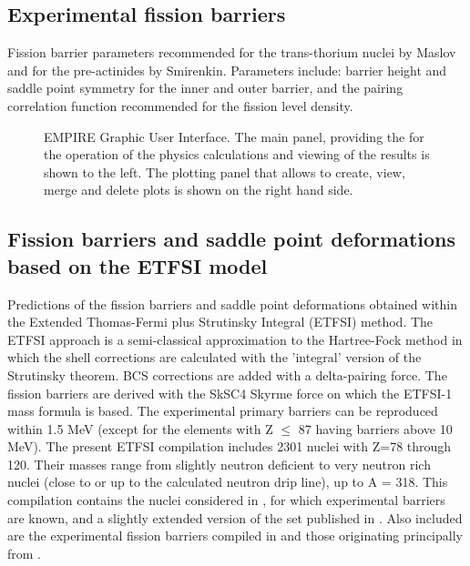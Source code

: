\subsection{Experimental fission barriers}

Fission barrier parameters recommended for the trans-thorium nuclei by
Maslov and for the pre-actinides by Smirenkin. Parameters include: barrier
height and saddle point symmetry for the inner and outer barrier, and the
pairing correlation function recommended for the fission level density.

\begin{figure*}[htbp]
 
\caption{EMPIRE Graphic User Interface. The main panel, providing the for
the operation of the physics calculations and viewing of the results is
shown to the left. The plotting panel that allows to create, view, merge
and delete plots is shown on the right hand side.}
\label{fig:GUI}
\end{figure*}

\subsection{Fission barriers and saddle point deformations based on the
ETFSI model}

Predictions of the fission barriers and saddle point deformations obtained
within the Extended Thomas-Fermi plus Strutinsky Integral (ETFSI) method.
The ETFSI approach is a semi-classical approximation to the Hartree-Fock
method in which the shell corrections are calculated with the 'integral'
version of the Strutinsky theorem. BCS corrections are added with a
delta-pairing force. The fission barriers are derived with the SkSC4 Skyrme
force on which the ETFSI-1 mass formula is based. The experimental primary
barriers can be reproduced within 1.5 MeV (except for the elements with Z $%
\le$ 87 having barriers above 10 MeV). The present ETFSI compilation
includes 2301 nuclei with Z=78 through 120. Their masses range from slightly
neutron deficient to very neutron rich nuclei (close to or up to the
calculated neutron drip line), up to A = 318. This compilation contains the
nuclei considered in \cite{Mamdouh1998}, for which experimental barriers are
known, and a slightly extended version of the set published in \cite%
{Mamdouh(2001)}. Also included are the experimental fission barriers
compiled in \cite{Mamdouh1998} and those originating principally from \cite%
{Smirenkin1993}.

